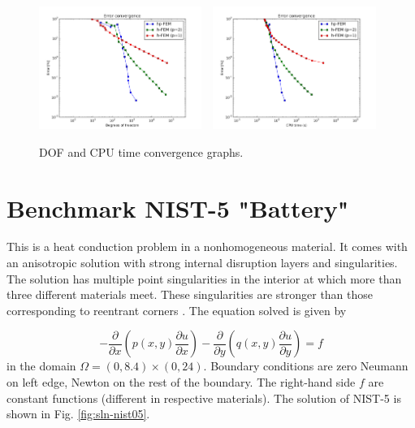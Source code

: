 \documentclass[12pt]{elsarticle}
\begin{document}
\begin{figure}[H]
\centering
\includegraphics[height=4cm]{nist/nist-4/conv_dof_aniso.png}\ \
\includegraphics[height=4cm]{nist/nist-4/conv_cpu_aniso.png}
\caption{DOF and CPU time convergence graphs.}
\label{fig:nist-4-conv}
\end{figure}


\section{Benchmark NIST-5 "Battery"}
\label{sec:bench-5}

This is a heat conduction problem in a nonhomogeneous material.
It comes with an anisotropic solution with strong internal disruption
layers and singularities.
The solution has multiple point singularities in the interior at which
more than three different materials meet. These singularities are stronger than those
corresponding to reentrant corners \cite{demkowicz-1}.
The equation solved is given by

\begin{equation} \label{heat-conduction}
-\frac{\partial }{\partial x}\left(p(x, y)\frac{\partial u}{\partial x}\right)
-\frac{\partial }{\partial y}\left(q(x, y)\frac{\partial u}{\partial y}\right) = f
\end{equation}
in the domain $\Omega = (0, 8.4) \times (0, 24)$. Boundary conditions are zero Neumann on left edge, Newton on the rest of the boundary.
The right-hand side $f$ are constant functions (different in respective materials).
The solution of NIST-5 is shown in Fig. \ref{fig:sln-nist05}.
\end{document}
